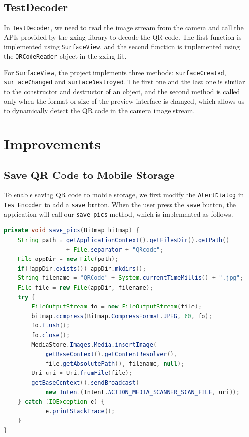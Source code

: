 \documentclass[12pt, a4paper]{article}
\theoremstyle{definition}
\begin{document}
\subsection{TestDecoder}
In \texttt{TestDecoder}, we need to read the image stream from the camera and call the APIs provided by the zxing library to decode the QR code. The first function is implemented using \texttt{SurfaceView}, and the second function is implemented using the \texttt{QRCodeReader} object in the zxing lib.

For \texttt{SurfaceView}, the project implements three methods: \texttt{surfaceCreated}, \texttt{surfaceChanged} and \texttt{surfaceDestroyed}. The first one and the last one is similar to the constructor and destructor of an object, and the second method is called only when the format or size of the preview interface is changed, which allows us to dynamically detect the QR code in the camera image stream.

\section{Improvements}
\subsection{Save QR Code to Mobile Storage}

To enable saving QR code to mobile storage, we first modify the \texttt{AlertDialog} in \texttt{TestEncoder} to add a \texttt{save} button. When the user press the \texttt{save} button, the application will call our \texttt{save\_pics} method, which is implemented as follows.
\begin{lstlisting}[language=java]
private void save_pics(Bitmap bitmap) {
    String path = getApplicationContext().getFilesDir().getPath() 
                  + File.separator + "QRcode";
    File appDir = new File(path);
    if(!appDir.exists()) appDir.mkdirs();
    String filename = "QRCode" + System.currentTimeMillis() + ".jpg";
    File file = new File(appDir, filename);
    try {
        FileOutputStream fo = new FileOutputStream(file);
        bitmap.compress(Bitmap.CompressFormat.JPEG, 60, fo);
        fo.flush();
        fo.close();
        MediaStore.Images.Media.insertImage(
            getBaseContext().getContentResolver(), 
            file.getAbsolutePath(), filename, null);
        Uri uri = Uri.fromFile(file);
        getBaseContext().sendBroadcast(
            new Intent(Intent.ACTION_MEDIA_SCANNER_SCAN_FILE, uri));
    } catch (IOException e) {
            e.printStackTrace();
    }
}
\end{lstlisting}
\end{document}
